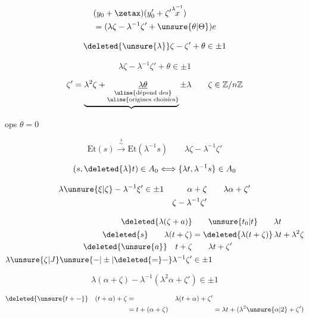 
\[
\begin{aligned}
&(y_0+\zetax)(y'_0+\zeta'\overset{\lambda^{-1}}{x})\\
&=(\lambda\zeta-\lambda^{-1}\zeta'+\unsure{\theta|\Theta})e
\end{aligned}
\]

\[
\deleted{\unsure{\lambda}}\zeta-\zeta'+\theta\in\pm1
\]

\[
\boxed{\lambda\zeta-\lambda^{-1}\zeta'+\theta\in\pm1}
\]

\[
\zeta'=\underbrace{\lambda^2\zeta+\underset{\substack{\text{\uline{dépend des}}\\\text{\uline{origines choisies}}}}{\underline{\lambda\theta}}}\pm\lambda
\qquad\zeta\in\mathbb Z/n\mathbb Z
\]

ops $\theta=0$

\[
\boxed{\mathrm{Et}(s)\xrightarrow{\overset{\lambda}{\sim}}\mathrm{Et}(\lambda^{-1}s)}
\qquad\lambda\zeta-\lambda^{-1}\zeta'
\]

\[
(s,\deleted{\lambda}t)\in A_0\Longleftrightarrow\{\lambda t,\lambda^{-1}s\}\in A_0
\]

\[
\begin{aligned}
\lambda\unsure{\xi|\zeta}-\lambda^{-1}\xi'&\in\pm1 &\alpha+\zeta&\qquad\lambda\alpha+\zeta'\\
&&\zeta-\lambda^{-1}\zeta'&
\end{aligned}
\]

\[
\begin{aligned}
\deleted{\lambda(\zeta+a)}&\qquad \unsure{t_0|t}\qquad\lambda t\\
\deleted{s}\qquad\lambda(t+\zeta)&=\deleted{\lambda(t+\zeta)}\,\lambda t+\lambda^2\zeta\\
\deleted{\unsure{a}}\quad t+\zeta&\qquad\lambda t+\zeta'\\
\lambda\unsure{\zeta|J}\unsure{-|\pm|\deleted{=}-}\lambda^{-1}\zeta'&\in\pm1
\end{aligned}
\]

\[
\lambda(\alpha+\zeta)-\lambda^{-1}(\lambda^2\alpha+\zeta')\in\pm1
\]

\[
\begin{aligned}
\deleted{\unsure{t+-}}\quad(t+\alpha)+\zeta&=&\lambda(t+\alpha)+\zeta'&\\
&=t+(\alpha+\zeta) & &=\lambda t+(\lambda^2\unsure{\alpha|2}+\zeta')
\end{aligned}
\]

